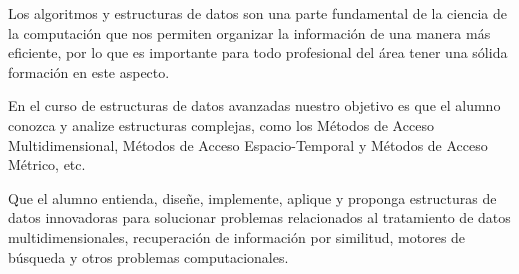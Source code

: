\begin{syllabus}


\begin{justification}
Los algoritmos y estructuras de datos son una parte fundamental de la ciencia de la computación que nos 
permiten organizar la información de una manera más eficiente, por lo que es importante para todo 
profesional del área tener una sólida formación en este aspecto.

En el curso de estructuras de datos avanzadas nuestro objetivo es que el alumno conozca y analize 
estructuras complejas, como los Métodos de Acceso Multidimensional, 
Métodos de Acceso Espacio-Temporal y 
Métodos de Acceso Métrico, etc.
\end{justification}

\begin{goals}
\item Que el alumno entienda, diseñe, implemente, aplique y
proponga estructuras de datos innovadoras para solucionar
problemas relacionados al tratamiento de datos multidimensionales,
recuperación de información por similitud, motores de búsqueda y
otros problemas computacionales.
\end{goals}

\begin{outcomes}
   \item {}
   \item {}
   \item {}
   \item {}
\end{outcomes}

\begin{competences}
    \item {} 
    \item {}
    \item {}
\end{competences}


\end{syllabus}
